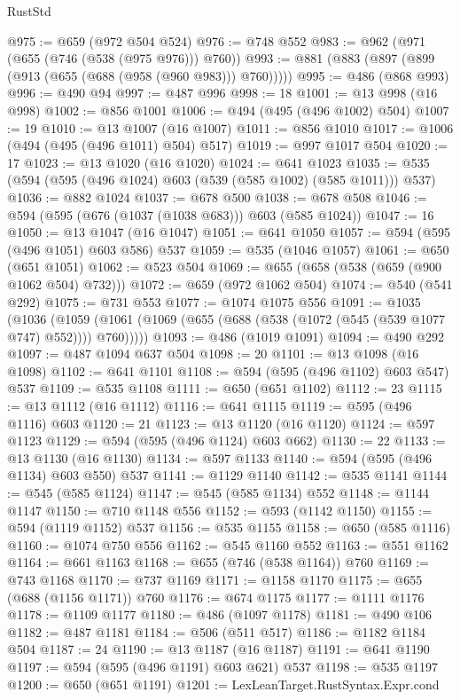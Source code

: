 \begin{lexlean}{RustStd}
\begin{coremodule}
@975 := @659 (@972 @504 @524)
@976 := @748 @552
@983 := @962 (@971 (@655 (@746 (@538 (@975 @976))) @760))
@993 := @881 (@883 (@897 (@899 (@913 (@655 (@688 (@958 (@960 @983))) @760)))))
@995 := @486 (@868 @993)
@996 := @490 @94
@997 := @487 @996
@998 := 18
@1001 := @13 @998 (@16 @998)
@1002 := @856 @1001
@1006 := @494 (@495 (@496 @1002) @504)
@1007 := 19
@1010 := @13 @1007 (@16 @1007)
@1011 := @856 @1010
@1017 := @1006 (@494 (@495 (@496 @1011) @504) @517)
@1019 := @997 @1017 @504
@1020 := 17
@1023 := @13 @1020 (@16 @1020)
@1024 := @641 @1023
@1035 := @535 (@594 (@595 (@496 @1024) @603 (@539 (@585 @1002) (@585 @1011))) @537)
@1036 := @882 @1024
@1037 := @678 @500
@1038 := @678 @508
@1046 := @594 (@595 (@676 (@1037 (@1038 @683))) @603 (@585 @1024))
@1047 := 16
@1050 := @13 @1047 (@16 @1047)
@1051 := @641 @1050
@1057 := @594 (@595 (@496 @1051) @603 @586) @537
@1059 := @535 (@1046 @1057)
@1061 := @650 (@651 @1051)
@1062 := @523 @504
@1069 := @655 (@658 (@538 (@659 (@900 @1062 @504) @732)))
@1072 := @659 (@972 @1062 @504)
@1074 := @540 (@541 @292)
@1075 := @731 @553
@1077 := @1074 @1075 @556
@1091 := @1035
    (@1036 (@1059 (@1061 (@1069 (@655 (@688 (@538 (@1072 (@545 (@539 @1077 @747) @552)))) @760)))))
@1093 := @486 (@1019 @1091)
@1094 := @490 @292
@1097 := @487 @1094 @637 @504
@1098 := 20
@1101 := @13 @1098 (@16 @1098)
@1102 := @641 @1101
@1108 := @594 (@595 (@496 @1102) @603 @547) @537
@1109 := @535 @1108
@1111 := @650 (@651 @1102)
@1112 := 23
@1115 := @13 @1112 (@16 @1112)
@1116 := @641 @1115
@1119 := @595 (@496 @1116) @603
@1120 := 21
@1123 := @13 @1120 (@16 @1120)
@1124 := @597 @1123
@1129 := @594 (@595 (@496 @1124) @603 @662)
@1130 := 22
@1133 := @13 @1130 (@16 @1130)
@1134 := @597 @1133
@1140 := @594 (@595 (@496 @1134) @603 @550) @537
@1141 := @1129 @1140
@1142 := @535 @1141
@1144 := @545 (@585 @1124)
@1147 := @545 (@585 @1134) @552
@1148 := @1144 @1147
@1150 := @710 @1148 @556
@1152 := @593 (@1142 @1150)
@1155 := @594 (@1119 @1152) @537
@1156 := @535 @1155
@1158 := @650 (@585 @1116)
@1160 := @1074 @750 @556
@1162 := @545 @1160 @552
@1163 := @551 @1162
@1164 := @661 @1163
@1168 := @655 (@746 (@538 @1164)) @760
@1169 := @743 @1168
@1170 := @737 @1169
@1171 := @1158 @1170
@1175 := @655 (@688 (@1156 @1171)) @760
@1176 := @674 @1175
@1177 := @1111 @1176
@1178 := @1109 @1177
@1180 := @486 (@1097 @1178)
@1181 := @490 @106
@1182 := @487 @1181
@1184 := @506 (@511 @517)
@1186 := @1182 @1184 @504
@1187 := 24
@1190 := @13 @1187 (@16 @1187)
@1191 := @641 @1190
@1197 := @594 (@595 (@496 @1191) @603 @621) @537
@1198 := @535 @1197
@1200 := @650 (@651 @1191)
@1201 := LexLeanTarget.RustSyntax.Expr.cond

\end{coremodule}
\end{lexlean}
